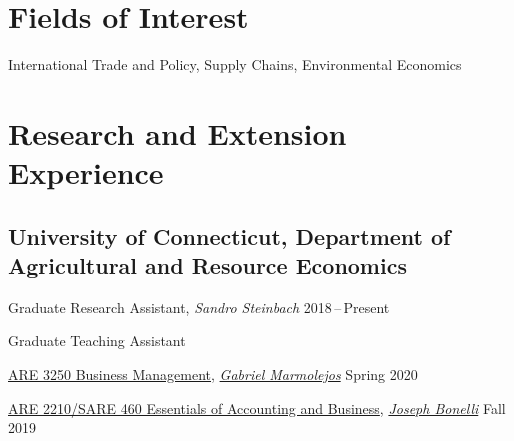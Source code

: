 \documentclass[11 pt,letterpaper]{article}
\renewenvironment{itemize}{
	\begin{list}{}{
			\setlength{\leftmargin}{1.5em}
		}
	}{
	\end{list}
}
\begin{document}
\begin{itemize}
		
		
	\end{itemize}
	
	\section*{\textbf{Fields of Interest}}
	
	International Trade and Policy,  Supply Chains, Environmental Economics
	
	\section*{\textbf{Research and Extension Experience}}
	
	\subsection*{University of Connecticut, Department of Agricultural and Resource Economics}
	
	\begin{itemize}
		\item[-] Graduate Research Assistant,    \textit{Sandro Steinbach} 	\hfill    2018\,--\,Present
		
	 
		 	
	 
 
		
 
	
				 
		
		\item[-] Graduate  Teaching Assistant
		
		\href{https://catalog.uconn.edu/directory-of-courses/course/}{ARE 3250 Business Management},
		\href{https://are.uconn.edu/person/gabriel-marmolejos/}{\textit{Gabriel Marmolejos}}
		\hfill   Spring 2020
		
		\href{https://catalog.uconn.edu/directory-of-courses/course/}{ARE 2210/SARE 460 Essentials of Accounting and Business},
		\href{https://cahnr.uconn.edu/person/joseph-bonelli/}{\textit{Joseph Bonelli}}
		\hfill   Fall 2019
	\end{itemize}
	
\end{document}
